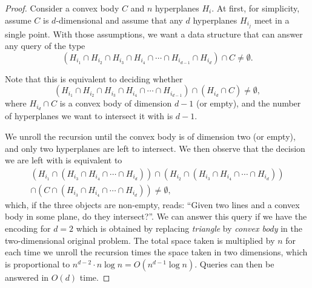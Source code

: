 \begin{proof}
  Consider a convex body \(C\) and \(n\) hyperplanes \(H_i\).
  At first, for simplicity, assume \(C\) is \(d\)-dimensional and
  assume that any \(d\) hyperplanes \(H_{i_j}\) meet in a single point.
  With those assumptions,
  we want a data structure that can answer any query of the type
  \begin{displaymath}
    (H_{i_1} \cap H_{i_2} \cap H_{i_3} \cap H_{i_4} \cap \cdots \cap
    H_{i_{d-1}} \cap H_{i_d})
    \cap C
    \neq \emptyset.
  \end{displaymath}

  Note that this is equivalent to deciding whether
  \begin{displaymath}
    (H_{i_1} \cap H_{i_2} \cap H_{i_3} \cap H_{i_4} \cap \cdots \cap H_{i_{d-1}})
    \cap (H_{i_d} \cap C)
    \neq \emptyset,
  \end{displaymath}
  where \(H_{i_d} \cap C\) is a convex body of dimension \(d-1\) (or empty), and the
  number of hyperplanes we want to intersect it with is \(d-1\).

  We unroll the recursion until the convex body is of dimension two (or empty),
  and only two hyperplanes are left to intersect. We then observe that the decision we
  are left with is equivalent to
  \begin{multline*}
    (H_{i_1} \cap (H_{i_3} \cap H_{i_4} \cap \cdots \cap H_{i_d}))
    \cap
    (H_{i_2} \cap (H_{i_3} \cap H_{i_4} \cap \cdots \cap H_{i_d}))\\
    \cap (C \cap (H_{i_3} \cap H_{i_4} \cap \cdots \cap H_{i_d}))
    \neq \emptyset,
  \end{multline*}
  which, if the three objects are non-empty, reads:
  ``Given two lines and a convex body in some plane, do they intersect?''.
  We can answer this query if we have the encoding for \(d = 2\) which is
  obtained by replacing \emph{triangle} by \emph{convex body} in the
  two-dimensional original problem. The total space taken is multiplied by
  \(n\) for each time we unroll the recursion times the space taken in two
  dimensions, which is proportional to \(n^{d-2} \cdot n \log{n} = O(n^{d-1} \log{n}) \).
  Queries can then be answered in \(O(d)\) time.


\end{proof}
